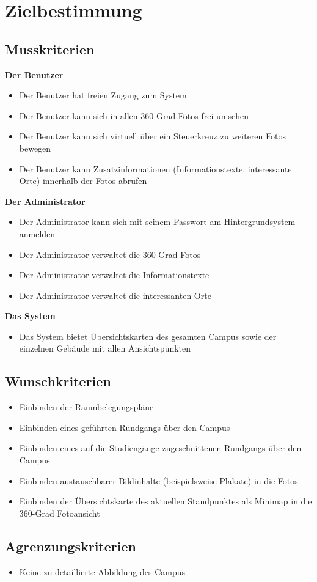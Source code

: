 \section{Zielbestimmung}
\label{sec:Zielbestimmung}

\subsection{Musskriterien}
\label{sec:Musskriterien}

\textbf{Der Benutzer}

\begin{itemize}
  \item Der Benutzer hat freien Zugang zum System
  \item Der Benutzer kann sich in allen 360-Grad Fotos frei umsehen
  \item Der Benutzer kann sich virtuell über ein Steuerkreuz zu weiteren Fotos bewegen
  \item Der Benutzer kann Zusatzinformationen (Informationstexte, interessante Orte) innerhalb der Fotos abrufen
\end{itemize}

\textbf{Der Administrator}

\begin{itemize}
  \item Der Administrator kann sich mit seinem Passwort am Hintergrundsystem anmelden
  \item Der Administrator verwaltet die 360-Grad Fotos
  \item Der Administrator verwaltet die Informationstexte
  \item Der Administrator verwaltet die interessanten Orte
\end{itemize}

\textbf{Das System}

\begin{itemize}
  \item Das System bietet Übersichtskarten des gesamten Campus sowie der einzelnen Gebäude mit allen Ansichtspunkten
\end{itemize}

\subsection{Wunschkriterien}
\label{sec:Wunschkriterien}

\begin{itemize}
  \item Einbinden der Raumbelegungspläne
  \item Einbinden eines geführten Rundgangs über den Campus
  \item Einbinden eines auf die Studiengänge zugeschnittenen Rundgangs über den Campus
  \item Einbinden austauschbarer Bildinhalte (beispielsweise Plakate) in die Fotos
  \item Einbinden der Übersichtskarte des aktuellen Standpunktes als Minimap in die 360-Grad Fotoansicht
\end{itemize}

\subsection{Agrenzungskriterien}
\label{sec:Agrenzungskriterien}

\begin{itemize}
  \item Keine zu detaillierte Abbildung des Campus
\end{itemize}